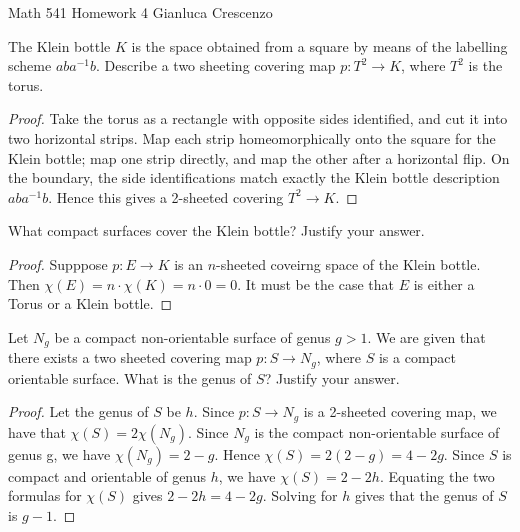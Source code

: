 \documentclass[10pt,oneside,openany]{memoir}
\begin{document}
\homeworktitle
{Math 541} %
{Homework 4} %
{Gianluca Crescenzo} %

\begin{exercise}
	The Klein bottle $K$ is the space obtained from a square by means of the labelling scheme $aba^{-1}b$. Describe a two sheeting covering map $p:T^2 \rightarrow K$, where $T^2$ is the torus.
\end{exercise}
	\begin{proof}
		Take the torus as a rectangle with opposite sides identified, and cut it into two horizontal strips. Map each strip homeomorphically onto the square for the Klein bottle; map one strip directly, and map the other after a horizontal flip. On the boundary, the side identifications match exactly the Klein bottle description $aba^{-1}b$. Hence this gives a 2-sheeted covering $T^2 \rightarrow K$.	
	\end{proof}

\begin{exercise}
	What compact surfaces cover the Klein bottle? Justify your answer.
\end{exercise}
	\begin{proof}
		Supppose $p:E \rightarrow K$ is an $n$-sheeted coveirng space of the Klein bottle. Then $\chi(E) = n \cdot \chi(K) = n \cdot 0 = 0$. It must be the case that $E$ is either a Torus or a Klein bottle.
	\end{proof}

\begin{exercise}
	Let $N_g$ be a compact non-orientable surface of genus $g > 1$. We are given that there exists a two sheeted covering map $p:S \rightarrow N_g$, where $S$ is a compact orientable surface. What is the genus of $S$? Justify your answer.
\end{exercise}
	\begin{proof}
		Let the genus of $S$ be $h$. Since $p:S \rightarrow N_g$ is a 2-sheeted covering map, we have that $\chi(S) = 2 \chi(N_g)$. Since $N_g$ is the compact non-orientable surface of genus g, we have $\chi(N_g) = 2-g$. Hence $\chi(S) = 2(2-g) = 4-2g$. Since $S$ is compact and orientable of genus $h$, we have $\chi(S) = 2-2h$. Equating the two formulas for $\chi(S)$ gives $2-2h = 4-2g$. Solving for $h$ gives that the genus of $S$ is $g-1$.
	\end{proof}
\end{document}
